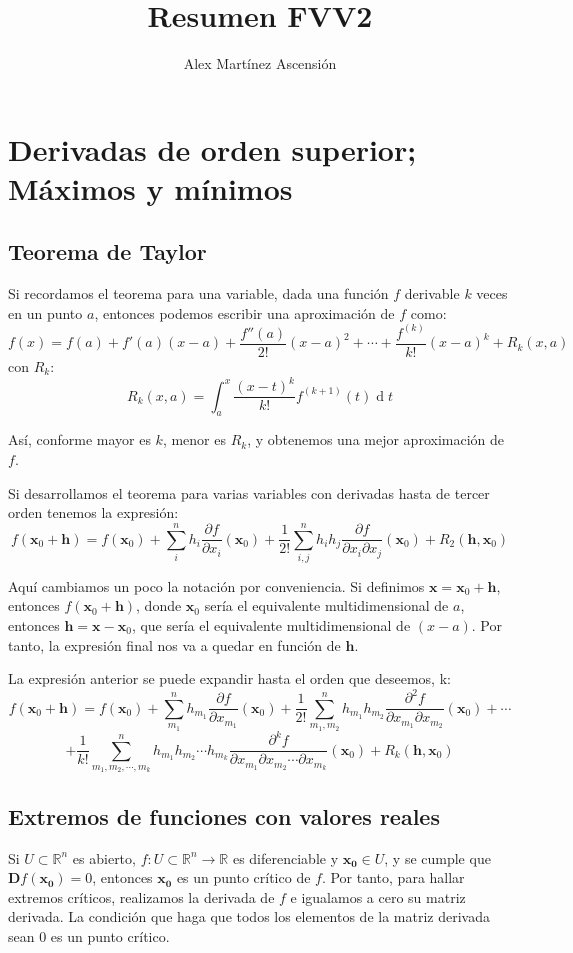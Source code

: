 \documentclass[a4paper]{article}
\title{\Huge{\vspace{-1em}Resumen FVV2}}
\author{\Large{\vspace{-1em}Alex Mart\'inez Ascensi\'on}}
\renewcommand{\d}[1]{\ensuremath{\operatorname{d}\!{#1}}}
\begin{document}
	\maketitle




\section{Derivadas de orden superior; Máximos y mínimos}
\subsection{Teorema de Taylor}
Si recordamos el teorema para una variable, dada una función $f$ derivable $k$ veces en un punto $a$, entonces podemos escribir una aproximación de $f$ como:
\[ f(x) = f(a) + f'(a) (x-a) + \frac{f''(a)}{2!} (x-a)^2 + \cdots + \frac{f^{(k)}}{k!}(x-a)^k + R_k(x,a)\]
con $R_k$:
\[ R_k(x,a) = \int_a^x{\frac{(x-t)^k}{k!}f^{(k+1)}(t) \d t} \]

Así, conforme mayor es $k$, menor es $R_k$, y obtenemos una mejor aproximación de $f$.

Si desarrollamos el teorema para varias variables con derivadas hasta de tercer orden tenemos la expresión:
\[ f(\textbf{x}_0+\textbf{h}) = f(\textbf{x}_0) + \sum^n_i{h_i\frac{\partial f}{\partial x_i}(\textbf{x}_0)} + \frac{1}{2!} \sum^n_{i,j}{h_ih_j\frac{\partial f}{\partial x_i \partial x_j}(\textbf{x}_0)} + R_2(\textbf{h}, \textbf{x}_0) \]

Aquí cambiamos un poco la notación por conveniencia. Si definimos $\textbf{x} = \textbf{x}_0 + \textbf{h}$, entonces  $f(\textbf{x}_0+\textbf{h})$, donde $\textbf{x}_0$ sería el equivalente multidimensional de $a$, entonces $\textbf{h} = \textbf{x} - \textbf{x}_0$, que sería el equivalente multidimensional de $(x-a)$. Por tanto, la expresión final nos va a quedar en función de $\textbf{h}$.

La expresión anterior se puede expandir hasta el orden que deseemos, k:
\[ f(\textbf{x}_0+\textbf{h}) = f(\textbf{x}_0) + \sum^n_{m_1}{h_{m_1}\frac{\partial f}{\partial x_{m_1}}(\textbf{x}_0)} + \frac{1}{2!} \sum^n_{{m_1},{m_2}}{h_{m_1}h_{m_2}\frac{\partial^2 f}{\partial x_{m_1} \partial x_{m_2}}(\textbf{x}_0)} + \cdots \]\[+
\frac{1}{k!} \sum^n_{{m_1},{m_2},\cdots,{m_k}}{h_{m_1}h_{m_2}\cdots h_{m_k}\frac{\partial^k f}{\partial x_{m_1} \partial x_{m_2} \cdots\partial x_{m_k}}(\textbf{x}_0)}
+ R_k(\textbf{h}, \textbf{x}_0) \]

\subsection{Extremos de funciones con valores reales}
Si $U \subset \mathbb{R}^n$ es abierto, $f: U \subset \mathbb{R}^n \rightarrow \mathbb{R}$ es diferenciable y $\textbf{x}_\textbf{0} \in U$, y se cumple que  $\textbf{D}f(\textbf{x}_\textbf{0}) = 0$, entonces $\textbf{x}_\textbf{0}$ es un punto crítico de $f$. Por tanto, para hallar extremos críticos, realizamos la derivada de $f$ e igualamos a cero su matriz derivada. La condición que haga que todos los elementos de la matriz derivada sean 0 es un punto crítico.
\end{document}
